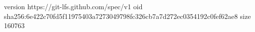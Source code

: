 version https://git-lfs.github.com/spec/v1
oid sha256:6e422c70fd5f11975403a7273049798fc326cb7a7d272ec0354192c0fef62ae8
size 160763
